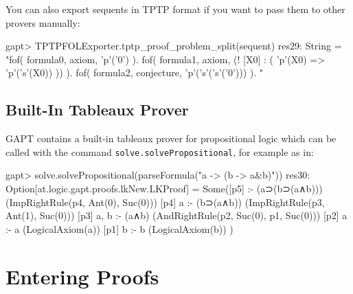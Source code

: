 \documentclass[a4paper,11pt]{article}
\begin{document}
You can also export sequents in TPTP format if you want to pass them to other
provers manually:
\begin{clilisting}
gapt> TPTPFOLExporter.tptp_proof_problem_split(sequent)
res29: String =
"fof( formula0, axiom, 'p'('0') ).
fof( formula1, axiom, (! [X0] : ( 'p'(X0) => 'p'('s'(X0)) )) ).
fof( formula2, conjecture, 'p'('s'('s'('0'))) ).
"

\end{clilisting}

\subsection{Built-In Tableaux Prover}

GAPT contains a  built-in tableaux prover for propositional logic
which can be called with the command \texttt{solve.solvePropositional}, for example as in:
\begin{clilisting}
gapt> solve.solvePropositional(parseFormula("a -> (b -> a&b)"))
res30: Option[at.logic.gapt.proofs.lkNew.LKProof] =
Some([p5]  :- (a⊃(b⊃(a∧b)))    (ImpRightRule(p4, Ant(0), Suc(0)))
[p4] a :- (b⊃(a∧b))    (ImpRightRule(p3, Ant(1), Suc(0)))
[p3] a, b :- (a∧b)    (AndRightRule(p2, Suc(0), p1, Suc(0)))
[p2] a :- a    (LogicalAxiom(a))
[p1] b :- b    (LogicalAxiom(b))
)

\end{clilisting}

\section{Entering Proofs}\label{sec:entering_proofs}
\end{document}
